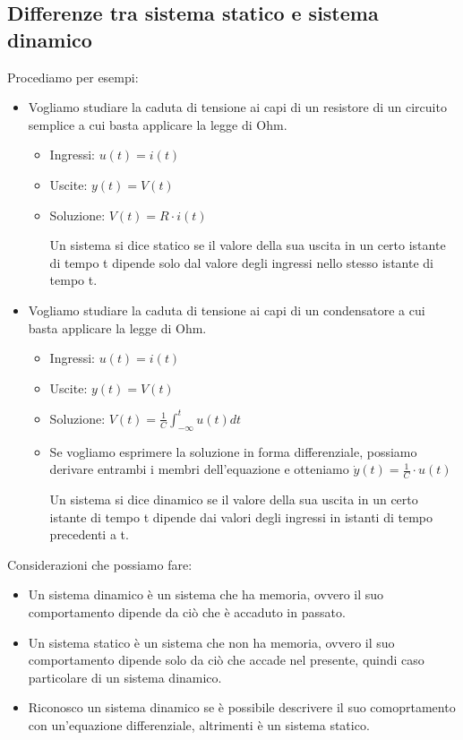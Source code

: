 \subsection{Differenze tra sistema statico e sistema dinamico}
Procediamo per esempi:
\begin{itemize}
    \item Vogliamo studiare la caduta di tensione ai capi di un resistore di un circuito
          semplice a cui basta applicare la legge di Ohm.
          \begin{itemize}
              \item Ingressi: $u(t) = i(t)$
              \item Uscite: $y(t) = V(t)$
              \item Soluzione: $V(t) = R \cdot i(t)$
                    \begin{tcolorbox}[colback=yellow!10, colframe=black]
                        Un sistema si dice statico se il valore della sua uscita in un certo istante di tempo t dipende solo dal valore degli ingressi nello stesso istante di tempo t.
                    \end{tcolorbox}
          \end{itemize}
    \item Vogliamo studiare la caduta di tensione ai capi di un condensatore a cui basta
          applicare la legge di Ohm.
          \begin{itemize}
              \item Ingressi: $u(t) = i(t)$
              \item Uscite: $y(t) = V(t)$
              \item Soluzione: $V(t) = \frac{1}{C} \int_{-\infty}^{t} u(t) dt$
              \item Se vogliamo esprimere la soluzione in forma differenziale, possiamo derivare
                    entrambi i membri dell'equazione e otteniamo $\dot{y}(t) = \frac{1}{C} \cdot
                        u(t)$
                    \begin{tcolorbox}[colback=yellow!10, colframe=black]
                        Un sistema si dice dinamico se il valore della sua uscita in un certo istante di tempo t dipende dai valori degli ingressi in istanti di tempo precedenti a t.
                    \end{tcolorbox}
          \end{itemize}
\end{itemize}
\newpage
Considerazioni che possiamo fare:
\begin{itemize}
    \item Un sistema dinamico è un sistema che ha memoria, ovvero il suo comportamento
          dipende da ciò che è accaduto in passato.
    \item Un sistema statico è un sistema che non ha memoria, ovvero il suo comportamento
          dipende solo da ciò che accade nel presente, quindi caso particolare di un
          sistema dinamico.
    \item Riconosco un sistema dinamico se è possibile descrivere il suo comoprtamento
          con un'equazione differenziale, altrimenti è un sistema statico.
\end{itemize}
